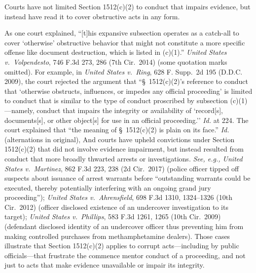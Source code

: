 Courts have not limited Section 1512(c)(2) to conduct that impairs evidence, but instead have read it to cover obstructive acts in any form.

As one court explained, ``[t]his expansive subsection operates as a catch-all to cover `otherwise' obstructive behavior that might not constitute a more specific offense like document destruction, which is listed in (c)(1).''
\textit{United States v.\ Volpendesto}, 746 F.3d 273, 286 (7th Cir.~2014) (some quotation marks omitted).
For example, in \textit{United States v.\ Ring}, 628 F. Supp.~2d 195 (D.D.C. 2009), the court rejected the argument that ``\S~1512(c)(2)'s reference to conduct that `otherwise obstructs, influences, or impedes any official proceeding' is limited to conduct that is similar to the type of conduct proscribed by subsection (c)(1)---namely, conduct that impairs the integrity or availability of `record[s], documents[s], or other object[s] for use in an official proceeding.''
\textit{Id.} at 224.
The court explained that ``the meaning of \S~1512(c)(2) is plain on its face.''
\textit{Id.} (alternations in original), And courts have upheld convictions under Section 1512(c)(2) that did not involve evidence impairment, but instead resulted from conduct that more broadly thwarted arrests or investigations.
\textit{See, e.g., United States v.\ Martinez}, 862 F.3d 223, 238 (2d Cir.~2017) (police officer tipped off suspects about issuance of arrest warrants before ``outstanding warrants could be executed, thereby potentially interfering with an ongoing grand jury proceeding'');
\textit{United States v.\ Ahrensfield}, 698 F.3d 1310, 1324--1326 (10th Cir.~2012) (officer disclosed existence of an undercover investigation to its target);
\textit{United States v.\ Phillips}, 583 F.3d 1261, 1265 (10th Cir.~2009) (defendant disclosed identity of an undercover officer thus preventing him from making controlled purchases from methamphetamine dealers).
Those cases illustrate that Section 1512(c)(2) applies to corrupt acts---including by public officials---that frustrate the commence mentor conduct of a proceeding, and not just to acts that make evidence unavailable or impair its integrity.

